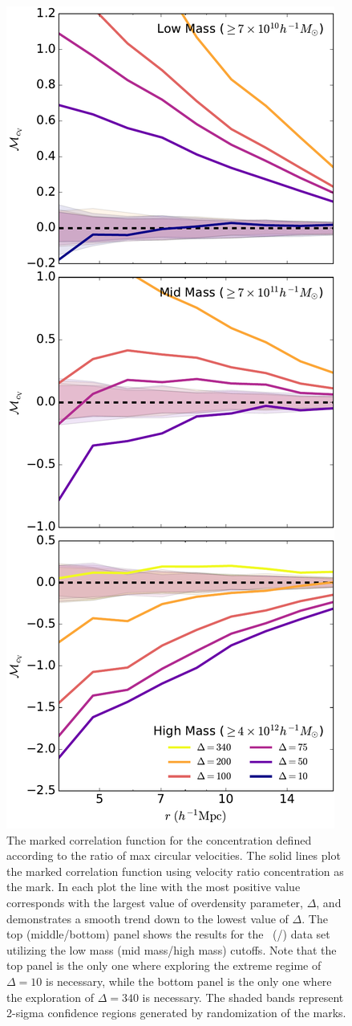 \documentclass[usenatbib]{mnras}
\begin{document}
\begin{figure}
	\centering
	\includegraphics[width=.4\textwidth]{all_mcf_cV.pdf}
	\caption{The marked correlation function for the concentration defined according to the ratio of max circular velocities. The solid lines plot the marked correlation function using velocity ratio concentration as the mark. In each plot the line with the most 
positive value corresponds with the largest value of overdensity parameter, 
$\Delta$, and demonstrates a smooth trend down to the lowest value of 
$\Delta$. The top (middle/bottom) panel shows the results for the
\simA \ (\simB /\simC) data set utilizing the low mass (mid mass/high mass) cutoffs. Note
that the top panel is the only one where exploring the extreme regime of $\Delta = 10$ is
necessary, while the bottom panel is the only one where the exploration of $\Delta = 340$
is necessary. The shaded bands represent 2-sigma confidence regions generated by randomization of the marks.
}
	\label{fig:cc_mcf_cV}
\end{figure}
\end{document}

